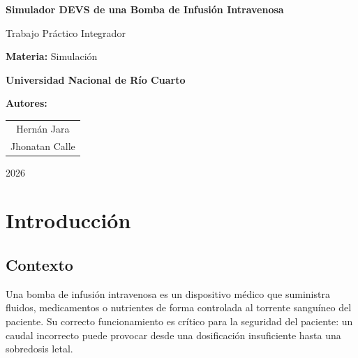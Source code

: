 \documentclass[12pt,a4paper]{article}
\begin{document}
\begin{titlepage}
    \centering
    \vspace*{3cm}
    
    {\Huge \textbf{Simulador DEVS de una Bomba de Infusión Intravenosa}}
    
    \vspace{1.5cm}
    
    {\Large Trabajo Práctico Integrador}
    
    \vspace{1cm}
    
    {\large \textbf{Materia:} Simulación}
    
    \vspace{0.5cm}
    
    {\large \textbf{Universidad Nacional de Río Cuarto}}
    
    \vspace{2cm}
    
    \textbf{Autores:}
    
    \vspace{0.3cm}
    
    \begin{tabular}{c}
        Hernán Jara \\
        Jhonatan Calle
    \end{tabular}
    
    \vspace{1cm}
    
    {\large 2026}
    
    \vfill
\end{titlepage}

\newpage

\tableofcontents
\newpage

\section{Introducción}

\subsection{Contexto}

Una bomba de infusión intravenosa es un dispositivo médico que suministra
fluidos, medicamentos o nutrientes de forma controlada al torrente sanguíneo
del paciente.  Su correcto funcionamiento es crítico para la seguridad del
paciente: un caudal incorrecto puede provocar desde una dosificación
insuficiente hasta una sobredosis letal.
\end{document}
